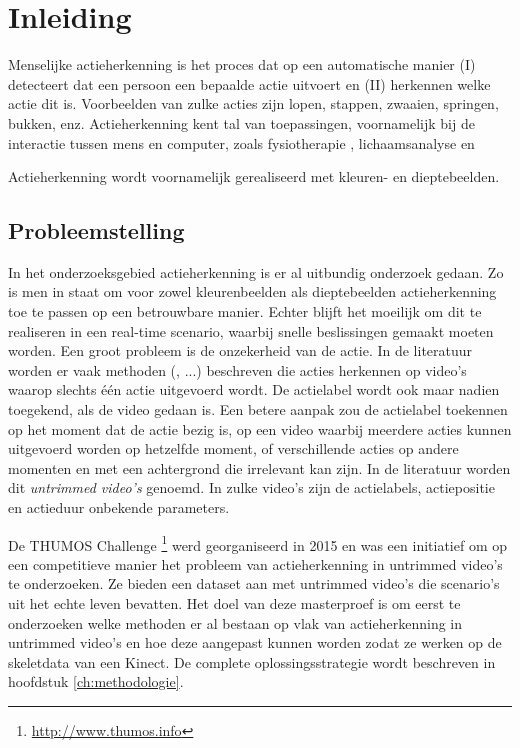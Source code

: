 \setcounter{page}{1}
\chapter{Inleiding}
\label{ch:Inleiding}
Menselijke actieherkenning is het proces dat op een automatische manier (I) detecteert dat een persoon een bepaalde actie uitvoert en (II) herkennen welke actie dit is. Voorbeelden van zulke acties zijn lopen, stappen, zwaaien, springen, bukken, enz. Actieherkenning kent tal van toepassingen, voornamelijk bij de interactie tussen mens en computer, zoals fysiotherapie \cite{Deboeverie2016}, lichaamsanalyse \cite{Devi2015} en 

Actieherkenning wordt voornamelijk gerealiseerd met kleuren- en dieptebeelden.







\section{Probleemstelling}
In het onderzoeksgebied actieherkenning is er al uitbundig onderzoek gedaan. Zo is men in staat om voor zowel kleurenbeelden als dieptebeelden actieherkenning toe te passen op een betrouwbare manier. Echter blijft het moeilijk om dit te realiseren in een real-time scenario, waarbij snelle beslissingen gemaakt moeten worden. Een groot probleem is de onzekerheid van de actie. In de literatuur worden er vaak methoden (\cite{Xia2012}, ...) beschreven die acties herkennen op video's waarop slechts één actie uitgevoerd wordt. De actielabel wordt ook maar nadien toegekend, als de video gedaan is. Een betere aanpak zou de actielabel toekennen op het moment dat de actie bezig is, op een video waarbij meerdere acties kunnen uitgevoerd worden op hetzelfde moment, of verschillende acties op andere momenten en met een achtergrond die irrelevant kan zijn. In de literatuur worden dit \textit{untrimmed video's} genoemd. In zulke video's zijn de actielabels, actiepositie en actieduur onbekende parameters.

 De THUMOS Challenge \footnote{\url{http://www.thumos.info}} werd georganiseerd in 2015 en was een initiatief om op een competitieve manier het probleem van actieherkenning in untrimmed video's te onderzoeken. Ze bieden een dataset aan met untrimmed video's die scenario's uit het echte leven bevatten. Het doel van deze masterproef is om eerst te onderzoeken welke methoden er al bestaan op vlak van actieherkenning in untrimmed video's en hoe deze aangepast kunnen worden zodat ze werken op de skeletdata van een Kinect. De complete oplossingsstrategie wordt beschreven in hoofdstuk \ref{ch:methodologie}.



